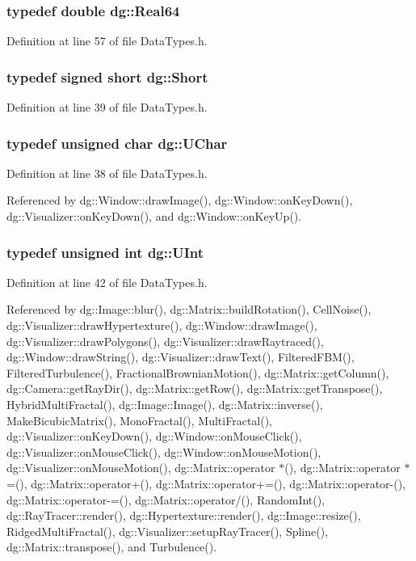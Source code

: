 \subsubsection{\setlength{\rightskip}{0pt plus 5cm}typedef double dg::Real64}\label{namespacedg_a27}




Definition at line 57 of file Data\-Types.h.
\subsubsection{\setlength{\rightskip}{0pt plus 5cm}typedef signed short dg::Short}\label{namespacedg_a12}




Definition at line 39 of file Data\-Types.h.
\subsubsection{\setlength{\rightskip}{0pt plus 5cm}typedef unsigned char dg::UChar}\label{namespacedg_a11}




Definition at line 38 of file Data\-Types.h.

Referenced by dg::Window::draw\-Image(), dg::Window::on\-Key\-Down(), dg::Visualizer::on\-Key\-Down(), and dg::Window::on\-Key\-Up().
\subsubsection{\setlength{\rightskip}{0pt plus 5cm}typedef unsigned int dg::UInt}\label{namespacedg_a15}




Definition at line 42 of file Data\-Types.h.

Referenced by dg::Image::blur(), dg::Matrix::build\-Rotation(), Cell\-Noise(), dg::Visualizer::draw\-Hypertexture(), dg::Window::draw\-Image(), dg::Visualizer::draw\-Polygons(), dg::Visualizer::draw\-Raytraced(), dg::Window::draw\-String(), dg::Visualizer::draw\-Text(), Filtered\-FBM(), Filtered\-Turbulence(), Fractional\-Brownian\-Motion(), dg::Matrix::get\-Column(), dg::Camera::get\-Ray\-Dir(), dg::Matrix::get\-Row(), dg::Matrix::get\-Transpose(), Hybrid\-Multi\-Fractal(), dg::Image::Image(), dg::Matrix::inverse(), Make\-Bicubic\-Matrix(), Mono\-Fractal(), Multi\-Fractal(), dg::Visualizer::on\-Key\-Down(), dg::Window::on\-Mouse\-Click(), dg::Visualizer::on\-Mouse\-Click(), dg::Window::on\-Mouse\-Motion(), dg::Visualizer::on\-Mouse\-Motion(), dg::Matrix::operator $\ast$(), dg::Matrix::operator $\ast$=(), dg::Matrix::operator+(), dg::Matrix::operator+=(), dg::Matrix::operator-(), dg::Matrix::operator-=(), dg::Matrix::operator/(), Random\-Int(), dg::Ray\-Tracer::render(), dg::Hypertexture::render(), dg::Image::resize(), Ridged\-Multi\-Fractal(), dg::Visualizer::setup\-Ray\-Tracer(), Spline(), dg::Matrix::transpose(), and Turbulence().
